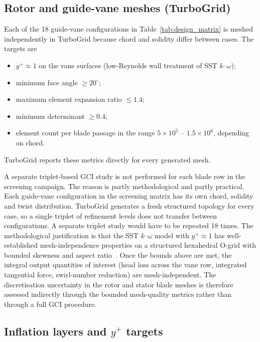 \subsection{Rotor and guide-vane meshes (TurboGrid)}
\label{sec:turbogrid_quality}

Each of the 18 guide-vane configurations in Table~\ref{tab:design_matrix} is meshed independently in TurboGrid because chord and solidity differ between cases. The targets are
\begin{itemize}
  \item $y^+ \approx 1$ on the vane surfaces (low-Reynolds wall treatment of SST $k$--$\omega$);
  \item minimum face angle $\geq 20^\circ$;
  \item maximum element expansion ratio $\leq 1.4$;
  \item minimum determinant $\geq 0.4$;
  \item element count per blade passage in the range $5\times 10^5$ -- $1.5\times 10^6$, depending on chord.
\end{itemize}
TurboGrid reports these metrics directly for every generated mesh.

A separate triplet-based GCI study is not performed for each blade row in the screening campaign. The reason is partly methodological and partly practical. Each guide-vane configuration in the screening matrix has its own chord, solidity and twist distribution. TurboGrid generates a fresh structured topology for every case, so a single triplet of refinement levels does not transfer between configurations. A separate triplet study would have to be repeated 18 times. The methodological justification is that the SST $k$--$\omega$ model with $y^+ \approx 1$ has well-established mesh-independence properties on a structured hexahedral O-grid with bounded skewness and aspect ratio~\cite{Menter1994}. Once the bounds above are met, the integral output quantities of interest (head loss across the vane row, integrated tangential force, swirl-number reduction) are mesh-independent. The discretisation uncertainty in the rotor and stator blade meshes is therefore assessed indirectly through the bounded mesh-quality metrics rather than through a full GCI procedure.

\subsection{Inflation layers and $y^+$ targets}
\label{sec:methods_inflation}

